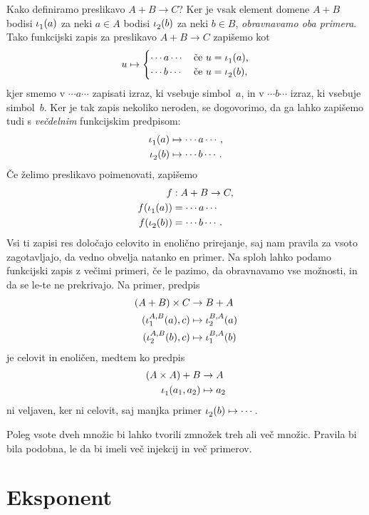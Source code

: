 Kako definiramo preslikavo $A + B \to C$? Ker je vsak element domene $A + B$ bodisi
$\inl(a)$ za neki $a \in A$ bodisi $\inr(b)$ za neki $b \in B$, \emph{obravnavamo oba
  primera}. Tako funkcijski zapis za preslikavo $A + B \to C$ zapišemo kot
%
\begin{equation*}
  u \mapsto
  \begin{cases}
    \cdots a \cdots & \text{če $u = \inl(a)$,}\\
    \cdots b \cdots & \text{če $u = \inr(b)$,}
  \end{cases}
\end{equation*}
%
kjer smemo v $\cdots a \cdots$ zapisati izraz, ki vsebuje simbol~$a$, in v
$\cdots b \cdots$ izraz, ki vsebuje simbol~$b$. Ker je tak zapis nekoliko neroden, se
dogovorimo, da ga lahko zapišemo tudi s \emph{večdelnim} funkcijskim predpisom:
%
\begin{align*}
  \inl(a) &\mapsto \cdots a \cdots, \\
  \inr(b) &\mapsto \cdots b \cdots.
\end{align*}
%
Če želimo preslikavo poimenovati, zapišemo
%
\begin{align*}
  f &: A + B \to C, \\
  f(\inl(a)) &= \cdots a \cdots \\
  f(\inr(b)) &= \cdots b \cdots.
\end{align*}
%
Vsi ti zapisi res določajo celovito in enolično prirejanje, saj nam pravila za vsoto
zagotavljajo, da vedno obvelja natanko en primer. Na sploh lahko podamo funkcijski zapis z
večimi primeri, če le pazimo, da obravnavamo vse možnosti, in da se le-te ne prekrivajo.
Na primer, predpis
%
\begin{align*}
  (A + B) \times C &\to B + A \\
  (\inl[A][B](a), c) &\mapsto \inr[B][A](a) \\
  (\inr[A][B](b), c) &\mapsto \inl[B][A](b)
\end{align*}
%
je celovit in enoličen, medtem ko predpis
%
\begin{align*}
  (A \times A) + B &\to A \\
  \inl(a_1, a_2) &\mapsto a_2
\end{align*}
%
ni veljaven, ker ni celovit, saj manjka primer $\inr(b) \mapsto \cdots$.

Poleg vsote dveh množic bi lahko tvorili zmnožek treh ali več množic. Pravila bi bila
podobna, le da bi imeli več injekcij in več primerov.

\section{Eksponent}
\label{sec:eksponent}

